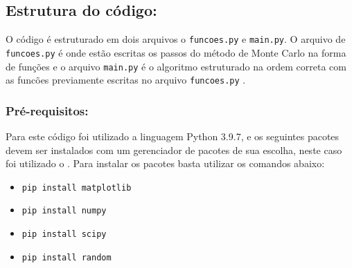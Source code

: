 \documentclass[11pt]{article}
\begin{document}
\subsection{Estrutura do código:}
\label{sec:orgd732bdd}
O código é estruturado em dois arquivos o \texttt{funcoes.py} e \texttt{main.py}. O arquivo de \texttt{funcoes.py} é onde estão escritas os passos do método de Monte Carlo na forma de funções e o arquivo \texttt{main.py} é o algoritmo estruturado na ordem correta com as funcões previamente escritas no arquivo \texttt{funcoes.py} .
\subsubsection{Pré-requisitos:}
\label{sec:org9b4e37d}
Para este código foi utilizado a linguagem Python 3.9.7, e os seguintes pacotes devem ser instalados com um gerenciador de pacotes de sua escolha, neste caso foi utilizado o . Para instalar os pacotes basta utilizar os comandos abaixo:

\begin{itemize}
\item \texttt{pip install matplotlib}
\item \texttt{pip install numpy}
\item \texttt{pip install scipy}
\item \texttt{pip install random}
\end{itemize}
\end{document}

